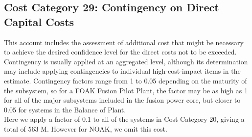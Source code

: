 \subsection{Cost Category 29: Contingency on Direct Capital Costs}

This account includes the assessment of additional cost that might be necessary to achieve the desired confidence level for the direct costs not to be exceeded. Contingency is usually applied at an aggregated level, although its determination may include applying contingencies to individual high-cost-impact items in the estimate.  Contingency factors range from 1 to 0.05 depending on the maturity of the subsystem, so for a FOAK Fusion Pilot Plant, the factor may be as high as 1 for all of the major subsystems included in the fusion power core, but closer to 0.05 for systems in the Balance of Plant.  \\

Here we apply a factor of 0.1 to all of the systems in Cost Category 20, giving a total of  563 M. {\color{blue} However for NOAK, we omit this cost.}

